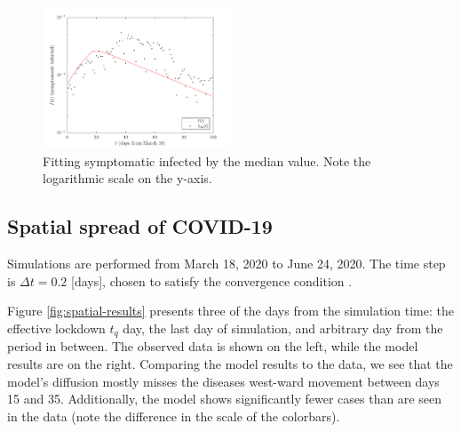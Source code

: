 \documentclass[11pt]{article}
\begin{document}
		\begin{figure}[h!]
			\centering
			\includegraphics[width=0.5\textwidth]{cases.pdf}
			\caption{Fitting symptomatic infected by the median value.
				Note the logarithmic scale on the y-axis.}
			\label{fig:fit}
		\end{figure}
	
	\subsection{Spatial spread of COVID-19} \label{sec:spread}
		Simulations are performed from March 18, 2020 to June 24, 2020.
		The time step is $\Delta t = 0.2$ [days], chosen to satisfy the convergence condition \cite{pde}.
		
		Figure \ref{fig:spatial-results} presents three of the days from the simulation time: the effective lockdown $t_q$ day, the last day of simulation, and arbitrary day from the period in between.
		The observed data is shown on the left, while the model results are on the right.
		Comparing the model results to the data, we see that the model's diffusion mostly misses the diseases west-ward movement between days 15 and 35.
		Additionally, the model shows significantly fewer cases than are seen in the data (note the difference in the scale of the colorbars).
		
\end{document}
